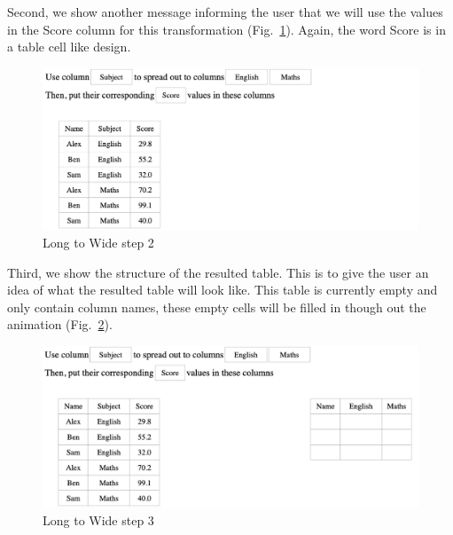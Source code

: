Second, we show another message informing the user that we will use the values in the Score column for this transformation (Fig.~\ref{fig:spread2}). Again, the word Score is in a table cell like design. 
\begin{figure}[H]
    \includegraphics[scale = 0.35]{Masters-Thesis/img/spread2.png}
    \caption{Long to Wide step 2}
    \label{fig:spread2}
\end{figure}


Third, we show the structure of the resulted table. This is to give the user an idea of what the resulted table will look like. This table is currently empty and only contain column names, these empty cells will be filled in though out the animation (Fig.~\ref{fig:spread3}). 
\begin{figure}[H]
    \includegraphics[scale = 0.35]{Masters-Thesis/img/spread3.png}
    \caption{Long to Wide step 3}
    \label{fig:spread3}
\end{figure}
\newpage

